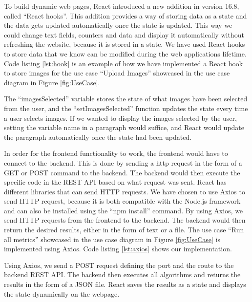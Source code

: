 To build dynamic web pages, React introduced a new addition in version 16.8, called ``React hooks''. This addition provides a way of storing data as a state and the data gets updated automatically once the state is updated. This way we could change text fields, counters and data and display it automatically without refreshing the website, because it is stored in a state. We have used React hooks to store data that we know can be modified during the web applications lifetime. Code listing \ref{lst:hook} is an example of how we have implemented a React hook to store images for the use case ``Upload Images'' showcased in the use case diagram in Figure \ref{fig:UseCase}.



The ``imagesSelected'' variable stores the state of what images have been selected from the user, and the ``setImagesSelected'' function updates the state every time a user selects images. If we wanted to display the images selected by the user, setting the variable name in a paragraph would suffice, and React would update the paragraph automatically once the state had been updated.

In order for the frontend functionality to work, the frontend would have to connect to the backend. This is done by sending a \acrshort{http} request in the form of a GET or POST command to the backend. The backend would then execute the specific code in the REST API based on what request was sent. React has different libraries that can send HTTP requests. We have chosen to use Axios to send HTTP request, because it is both compatible with the Node.js framework and can also be installed using the ``npm install'' command. By using Axios, we send HTTP requests from the frontend to the backend. The backend would then return the desired results, either in the form of text or a file. The use case ``Run all metrics'' showcased in the use case diagram in Figure \ref{fig:UseCase} is implemented using Axios.  
Code listing \ref{lst:axios} shows our implementation. 
\newpage


Using Axios, we send a POST request defining the port and the route to the backend REST API. The backend then executes all algorithms and returns the results in the form of a JSON file. React saves the results as a state and displays the state dynamically on the webpage. 

